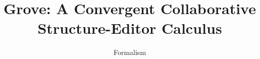 \documentclass[acmsmall,10pt,review,anonymous]{acmart}\settopmatter{printfolios=true,printccs=false,printacmref=false}
\begin{document}
\title[Grove]{Grove: A Convergent Collaborative Structure-Editor Calculus}
\subtitle{Formalism}

\maketitle


\end{document}
